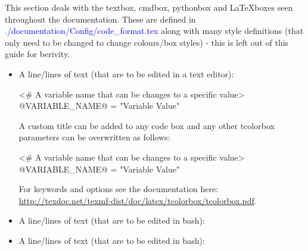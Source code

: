 This section deals with the textbox, cmdbox, pythonbox and \LaTeX boxes seen throughout the documentation. These are defined in \textcolor{blue}{./documentation/Config/code\_format.tex} along with many style definitions (that only need to be changed to change colours/box styles) - this is left out of this guide for berivity.

\begin{itemize}


\item \begin{minipage}[t]{\textwidth} 
A line/lines of text (that are to be edited in a text editor):
\begin{latexbox}
\begin{textbox}
<# A variable name that can be changes to a specific value>
@VARIABLE_NAME@ = "Variable Value"
\end{textbox}
\end{latexbox}
\end{minipage}

\begin{note}
A custom title can be added to any code box and any other tcolorbox parameters can be overwritten as follows:

\begin{latexbox}
\begin{textbox}[title={Custom title}, colback=blue!30!white]
<# A variable name that can be changes to a specific value>
@VARIABLE_NAME@ = "Variable Value"
\end{textbox}
\end{latexbox}

For keywords and options see the  documentation here: \url{http://texdoc.net/texmf-dist/doc/latex/tcolorbox/tcolorbox.pdf}. 
\end{note}


\item \begin{minipage}[t]{\textwidth} 
A line/lines of text (that are to be edited in bash):
\begin{latexbox}
\end{latexbox}
\end{minipage}


\item \begin{minipage}[t]{\textwidth}
A line/lines of text (that are to be edited in bash):
\begin{latexbox}
\end{latexbox}
\end{minipage}



\end{itemize}
